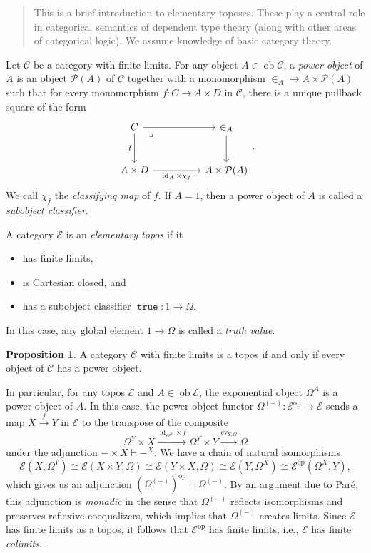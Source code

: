 \documentclass[10pt,letterpaper,cm]{nupset}
\theoremstyle{definition}
\theoremstyle{theorem}
\newtheorem{prop}[definition]{Proposition}
\theoremstyle{remark}
\renewcommand{\P}{\mathcal P}
\newcommand{\1}{\mathbf{1}}
\renewcommand{\c}{\mathscr{C}}
\newcommand{\e}{\mathscr{E}}
\newcommand{\0}{\vec 0}
\DeclareMathOperator*{\ev}{ev}
\DeclareMathOperator{\id}{id}
\DeclareMathOperator{\true}{\mathtt{true}}
\DeclareMathOperator{\op}{op}
\DeclareMathOperator{\ob}{ob}
\newcommand{\bi}{\begin{itemize}}
\newcommand{\ei}{\end{itemize}}
\begin{document}
\begin{abstract}
This is a brief introduction to elementary toposes. These play a central role in categorical semantics of dependent type theory (along with other areas of categorical logic). We assume knowledge of basic category theory.
\end{abstract}

\bigskip

Let $\c$ be a category with finite limits. For any object $A \in \ob{\c}$, a \textit{power object} of $A$ is  an object $\P(A)$ of $\c$ together with a monomorphism $\in_A  \to A \times \P(A)$ such that for every monomorphism $ f: C \to A \times D$ in $\c$, there is a unique pullback square of the form
\[
\begin{tikzcd}[column sep=huge, row sep=large, ampersand replacement=\&]
	C \& \in_A \\
	A \times D \& A \times \P(A)
	\arrow[from=1-2, to=2-2]
	\arrow["f"', from=1-1, to=2-1]
	\arrow["{\id_A \times \chi_f}"', from=2-1, to=2-2]
	\arrow[from=1-1, to=1-2]
	\arrow["\lrcorner"{anchor=center, pos=0.125}, draw=none, from=1-1, to=2-2]
\end{tikzcd}
.\] We call $\chi_f$ the \textit{classifying map} of $f$. If $A = 1$, then a power object of $A$ is called a \textit{subobject classifier}.

\medskip

A category $\e$ is an  \textit{elementary topos} if it
\bi
\item has finite limits,
\item is Cartesian closed, and
\item has a subobject classifier $\true : 1 \to \Omega$.
\ei
In this case, any global element $1 \to \Omega$  is called a \textit{truth value}. 

\begin{prop}\label{power}
A category $\c$ with finite limits is a topos if and only if every object of $\c$ has a power object. 
\end{prop}

In particular, for any topos $\e$ and $A\in \ob{\e}$, the exponential object $\Omega^A$ is a power object of $A$. In this case, the power object functor $\Omega^{\left({-}\right)} : \e^{\op} \to \e$ sends a map  $X \xrightarrow{f} Y$ in $\e$ to the transpose of the composite 
\[
\Omega^Y \times X \xrightarrow{\id_{\Omega^B} \times f}  \Omega^{Y} \times Y \xrightarrow{\ev_{Y, \Omega}} \Omega
\] under the adjunction ${-} \times X \vdash {-}^X$. We have a chain of natural isomorphisms
\[
\e(X, \Omega^Y) \cong \e(X \times Y, \Omega) \cong \e(Y \times X, \Omega) \cong \e(Y, \Omega^X) \cong \e^{\op}(\Omega^X, Y)
,\] which gives us an adjunction $\left(\Omega^{\left({-}\right)}\right)^{\op} \vdash \Omega^{\left({-}\right)}$. 
By an argument due to Par\'e, this adjunction is \textit{monadic} in the sense that $\Omega^{\left({-}\right)}$ reflects isomorphisms and preserves reflexive coequalizers, which implies that $\Omega^{\left({-}\right)}$ creates limits. Since $\e$ has finite limits as a topos, it follows that $\e^{\op}$ has finite limits, i.e., $\e$ has finite \emph{colimits}.
\end{document}
